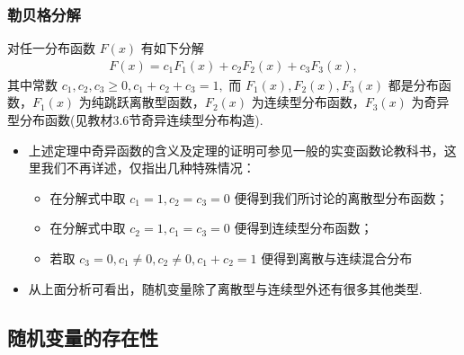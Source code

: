 \begin{frame}
	\frametitle{勒贝格分解}
	\begin{thm}[勒贝格分解] 对任一分布函数 $F (x)$ 有如下分解
		\begin{eqnarray*}
			F(x)=c_1F_1(x)+c_2F_2(x)+c_3F_3(x),
		\end{eqnarray*}
		其中常数 $c_1,c_2,c_3\ge 0, c_1+c_2+c_3=1,$ 而 $F_1 (x),F_2 (x),F_3 (x)$ 都是分布函数，$F_1 (x)$ 为纯跳跃离散型函数，$F_2 (x)$ 为连续型分布函数，$F_3 (x)$ 为奇异型分布函数(见教材3.6节奇异连续型分布构造).
	\end{thm}
	\vspace{0.3cm}
	\pause
	\begin{itemize}[<+-|alert@+>]
		\item 上述定理中奇异函数的含义及定理的证明可参见一般的实变函数论教科书，这里我们不再详述，仅指出几种特殊情况：
		      \begin{itemize}
			      \item 在分解式中取 $c_1=1,c_2=c_3=0$ 便得到我们所讨论的离散型分布函数；
			      \item 在分解式中取 $c_2=1,c_1=c_3=0$ 便得到连续型分布函数；
			      \item 若取 $c_3=0, c_1\neq 0, c_2\neq 0, c_1+c_2=1$ 便得到离散与连续混合分布
		      \end{itemize}
		\item 从上面分析可看出，随机变量除了离散型与连续型外还有很多其他类型.
	\end{itemize}

\end{frame}


\subsection{随机变量的存在性}

